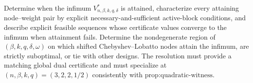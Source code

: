 Determine when the infimum \(V^*_{n,\beta,k,q,\delta}\) is attained, characterize every attaining node--weight pair by explicit necessary-and-sufficient active-block conditions, and describe explicit feasible sequences whose certificate values converge to the infimum when attainment fails. Determine the nondegenerate region of \((\beta,k,q,\delta,\omega)\) on which shifted Chebyshev--Lobatto nodes attain the infimum, are strictly suboptimal, or tie with other designs. The resolution must provide a matching global dual certificate and must specialize at \((n,\beta,k,q)=(3,2,2,1/2)\) consistently with \(\text{prop:quadratic-witness}\).
